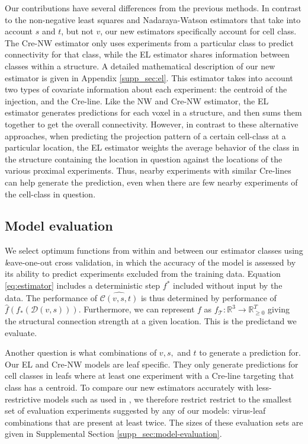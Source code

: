 Our contributions have several differences from the previous methods.
In contrast to the non-negative least squares \citep{Oh2014-kh} and Nadaraya-Watson  \citep{Knox2019-ot} estimators that take into account $s$ and $t$, but not $v$, our new estimators specifically account for cell class.
The Cre-NW estimator only uses experiments from a particular class to predict connectivity for that class, while the EL estimator shares information between classes within a structure.
A detailed mathematical description of our new estimator is given in Appendix \ref{supp_sec:el}.
This estimator takes into account two types of covariate information about each experiment: the centroid of the injection, and the Cre-line.
Like the NW and Cre-NW estimator, the EL estimator generates predictions for each voxel in a structure, and then sums them together to get the overall connectivity.
However, in contrast to these alternative approaches, when predicting the projection pattern of a certain cell-class at a particular location, the EL estimator weights the average behavior of the class in the structure containing the location in question against the locations of the various proximal experiments. 
Thus, nearby experiments with similar Cre-lines can help generate the prediction, even when there are few nearby experiments of the cell-class in question.

\newpage

\subsection{Model evaluation}

We select optimum functions from within and between our estimator classes using {\textit leave-one-out cross validation}, in which the accuracy of the model is assessed by its ability to predict experiments excluded from the training data. %
Equation \ref{eq:estimator} includes a deterministic step $f^*$ included without input by the data.
The performance of $\widehat {\mathcal C (v,s,t)}$ is thus determined by performance of $\widehat f (f_*(\mathcal D(v,s)))$.
Furthermore, we can represent $f$ as $f_{\mathcal T}: \mathbb R^3 \to \mathbb R_{\geq 0}^T$ giving the structural connection strength at a given location.
This is the predictand we evaluate. 

Another question is what combinations of $v, s, $ and $t$ to generate a prediction for.
Our EL and Cre-NW models are leaf specific.
They only generate predictions for cell classes in leafs where at least one experiment with a Cre-line targeting that class has a centroid.
To compare our new estimators accurately with less-restrictive models such as used in \citet{Knox2019-ot}, we therefore restrict restrict to the smallest set of evaluation experiments suggested by any of our models: virus-leaf combinations that are present at least twice. 
The sizes of these evaluation sets are given in Supplemental Section \ref{supp_sec:model-evaluation}.

